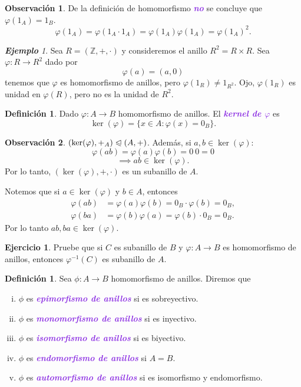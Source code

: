 \documentclass{article}
\theoremstyle{definition}
\newtheorem{definition}[theorem]{Definición}
\newtheorem{exercise}{Ejercicio}
\newtheorem*{obs}{Observación}
\theoremstyle{remark}
\newtheorem{example}[theorem]{\textbf{Ejemplo}}
\numberwithin{equation}{section}
\newcommand{\Z}{\mathbb{Z}}
\newcommand{\vphi}{\varphi}
\renewcommand{\c}{\cdot}
\newcommand{\normal}{\trianglelefteqslant}
\newcommand{\wea}[1]{\textcolor{BlueViolet}{\textbf{\emph{#1}}}}
\begin{document}
\begin{obs}
  De la definición de homomorfismo \wea{no} se concluye que $\vphi(1_A) = 1_B$. 
  \[ \vphi(1_A) = \vphi(1_A \c 1_A) = \vphi(1_A) \vphi(1_A) = \vphi(1_A)^2. \]
\end{obs}

\begin{example}
  Sea $R = (\Z,+,\c)$ y consideremos el anillo $R^2 = R \times R$. Sea $\vphi \colon R \to R^2$ dado por 
  \[ \vphi(a) = (a,0) \]
  tenemos que $\vphi$ es homomorfismo de anillos, pero $\vphi(1_R) \neq 1_{R^2}$.
  Ojo, $\vphi(1_R)$ es unidad en $\vphi(R)$, pero no es la unidad de $R^2$.
\end{example}

\begin{definition}
  Dado $\vphi \colon A \to B$ homomorfismo de anillos. El \wea{kernel de $\vphi$} es 
  \[ \ker(\vphi) = \{x \in A \colon \vphi(x) = 0_B\}. \]
\end{definition}

\begin{obs}
  $(\ker(\vphi),+_A) \normal (A,+)$.
  Además, si $a,b \in \ker(\vphi)$: 
  \[ \vphi(ab) = \vphi(a) \vphi(b) = 0 \ 0 = 0 \]
  \[ \implies ab \in \ker(\vphi). \]
  Por lo tanto, $(\ker(\vphi),+,\c)$ es un subanillo de $A$.

  Notemos que si $a \in \ker(\vphi)$ y $b \in A$, entonces 
  \begin{align*}
      \vphi(ab) &= \vphi(a) \vphi(b) = 0_B \c \vphi(b) = 0_B, \\
      \vphi(ba) &= \vphi(b) \vphi(a) = \vphi(b) \c 0_B = 0_B.
  \end{align*}
  Por lo tanto $ab,ba \in \ker(\vphi)$.
\end{obs}

\begin{exercise}
  Pruebe que si $C$ es subanillo de $B$ y $\vphi \colon A \to B$ es homomorfismo de anillos, entonces $\vphi^{-1}(C)$ es subanillo de $A$.
\end{exercise}

\begin{definition}
  Sea $\phi \colon A \to B$ homomorfismo de anillos. Diremos que
  \begin{enumerate}[(i)]
    \item $\phi$ es \wea{epimorfismo de anillos} si es sobreyectivo.
    \item $\phi$ es \wea{monomorfismo de anillos} si es inyectivo.
    \item $\phi$ es \wea{isomorfismo de anillos} si es biyectivo.
    \item $\phi$ es \wea{endomorfismo de anillos} si $A=B$.
    \item $\phi$ es \wea{automorfismo de anillos} si es isomorfismo y endomorfismo.
  \end{enumerate}
\end{definition}
\end{document}
